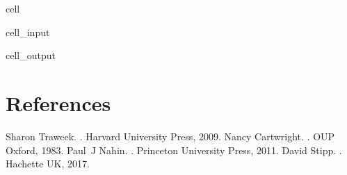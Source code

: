 \documentclass[letterpaper,10pt,english]{jupyterBook}
\begin{document}
\begin{sphinxuseclass}{cell}\begin{sphinxVerbatimInput}

\begin{sphinxuseclass}{cell_input}
\begin{sphinxVerbatim}[commandchars=\\\{\}]
\end{sphinxVerbatim}

\end{sphinxuseclass}\end{sphinxVerbatimInput}
\begin{sphinxVerbatimOutput}

\begin{sphinxuseclass}{cell_output}
\begin{sphinxVerbatim}
\end{sphinxVerbatim}

\noindent{}

\end{sphinxuseclass}\end{sphinxVerbatimOutput}

\end{sphinxuseclass}
\sphinxstepscope


\chapter{References}
\label{\detokenize{content/X_additional_pages/references-page:references}}\label{\detokenize{content/X_additional_pages/references-page::doc}}
\begin{sphinxthebibliography}{1}
\sphinxAtStartPar
Sharon Traweek. . Harvard University Press, 2009.
\sphinxAtStartPar
Nancy Cartwright. . OUP Oxford, 1983.
\sphinxAtStartPar
Paul J Nahin. . Princeton University Press, 2011.
\sphinxAtStartPar
David Stipp. . Hachette UK, 2017.
\end{sphinxthebibliography}







\renewcommand{\indexname}{Index}
\printindex
\end{document}
